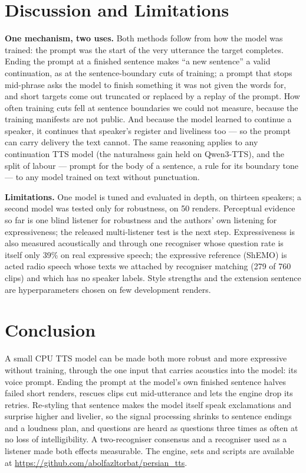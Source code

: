\documentclass[conference]{IEEEtran}
\newcommand{\RES}[1]{#1}
\newcommand{\CODEURL}{\url{https://github.com/abolfazltorbat/persian_tts}}
\begin{document}
\section{Discussion and Limitations}\label{sec:discussion}
\textbf{One mechanism, two uses.} Both methods follow from how the model was trained: the prompt was the
start of the very utterance the target completes. Ending the prompt at a finished sentence makes ``a new
sentence'' a valid continuation, as at the sentence-boundary cuts of training; a prompt that stops
mid-phrase asks the model to finish something it was not given the words for, and short targets come out
truncated or replaced by a replay of the prompt. How often training cuts fell at sentence boundaries we could
not measure, because the training manifests are not public. And because the model learned to continue a speaker, it
continues that speaker's register and liveliness too --- so the prompt can carry delivery the text cannot. The
same reasoning applies to any continuation TTS model (the naturalness gain held on Qwen3-TTS), and the split of labour --- prompt for the body of a
sentence, a rule for its boundary tone --- to any model trained on text without punctuation.

\textbf{Limitations.} One model is tuned and evaluated in depth, on thirteen speakers; a second model was
tested only for robustness, on 50 renders. Perceptual evidence so far is one
blind listener for robustness and the authors' own listening for expressiveness; the released multi-listener
test is the next step. Expressiveness is also measured acoustically and
through one recogniser whose question rate is itself only \RES{39\%} on real expressive speech; the
expressive reference (ShEMO) is acted radio speech whose texts we attached by recogniser matching
(\RES{279} of \RES{760} clips) and which has no speaker labels. Style strengths and the extension sentence are
hyperparameters chosen on few development renders.

\section{Conclusion}\label{sec:conclusion}
A small CPU TTS model can be made both more robust and more expressive without training, through the one
input that carries acoustics into the model: its voice prompt. Ending the prompt at the model's own finished
sentence halves failed short renders, rescues clips cut mid-utterance and lets the engine drop its retries.
Re-styling that sentence makes the model itself speak exclamations and surprise higher and livelier, so the
signal processing shrinks to sentence endings and a loudness plan, and questions are heard as questions three
times as often at no loss of intelligibility. A two-recogniser consensus and a recogniser used as a listener
made both effects measurable. The engine, sets and scripts are available at \CODEURL.



\end{document}
